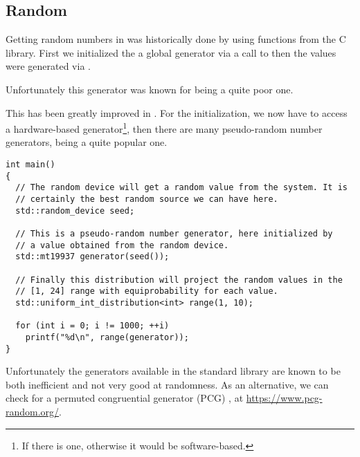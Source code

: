 \subsection{Random}

Getting random numbers in \cpp{} was historically done by using
functions from the C library. First we initialized the a global
generator via a call to  then the values were generated
via .

Unfortunately this generator was known for being a quite poor one.

This has been greatly improved in . For the initialization, we
now have  to access a hardware-based
generator\footnote{If there is one, otherwise it would be
  software-based.}, then there are many pseudo-random number
generators,  being a quite popular one.

\begin{lstlisting}
int main()
{
  // The random device will get a random value from the system. It is
  // certainly the best random source we can have here.
  std::random_device seed;

  // This is a pseudo-random number generator, here initialized by
  // a value obtained from the random device.
  std::mt19937 generator(seed());

  // Finally this distribution will project the random values in the
  // [1, 24] range with equiprobability for each value.
  std::uniform_int_distribution<int> range(1, 10);

  for (int i = 0; i != 1000; ++i)
    printf("%d\n", range(generator));
}
\end{lstlisting}

Unfortunately the generators available in the standard library are
known to be both inefficient and not very good at randomness. As an
alternative, we can check for a permuted congruential generator (PCG)
\cite{pcg}, at \url{https://www.pcg-random.org/}.
